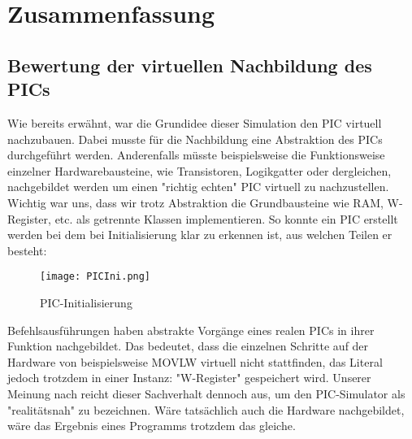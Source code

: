 \documentclass[
10pt, %
a4paper, %
oneside, %
headinclude,footinclude, %
BCOR5mm, %
]{scrartcl}
\begin{document}
\section{Zusammenfassung}
	\subsection{Bewertung der virtuellen Nachbildung des PICs}
		Wie bereits erwähnt, war die Grundidee dieser Simulation den PIC virtuell nachzubauen. Dabei musste für die Nachbildung eine Abstraktion des PICs durchgeführt werden. Anderenfalls müsste beispielsweise die Funktionsweise einzelner Hardwarebausteine, wie Transistoren, Logikgatter oder dergleichen, nachgebildet werden um einen "richtig echten" PIC virtuell zu nachzustellen. Wichtig war uns, dass wir trotz Abstraktion die Grundbausteine wie RAM, W-Register, etc. als getrennte Klassen implementieren. So konnte ein PIC erstellt werden bei dem bei Initialisierung klar zu erkennen ist, aus welchen Teilen er besteht:
		
		\begin{figure}[h]
			\begin{center}
				\texttt{[image: PICIni.png]}
				\caption{PIC-Initialisierung}
			\end{center}
		\end{figure}
		
		Befehlsausführungen haben abstrakte Vorgänge eines realen PICs in ihrer Funktion nachgebildet. Das bedeutet, dass die einzelnen Schritte auf der Hardware von beispielsweise MOVLW virtuell nicht stattfinden, das Literal jedoch trotzdem in einer Instanz: "W-Register" gespeichert wird. Unserer Meinung nach reicht dieser Sachverhalt dennoch aus, um den PIC-Simulator als "realitätsnah" zu bezeichnen. Wäre tatsächlich auch die Hardware nachgebildet, wäre das Ergebnis eines Programms trotzdem das gleiche.  
		\newpage
\end{document}
